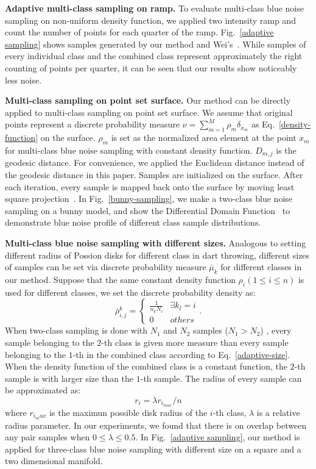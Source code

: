 \textbf{Adaptive multi-class sampling on ramp.}
To evaluate multi-class blue noise sampling on non-uniform density function,
we applied two intensity ramp and count the number of points for each quarter of the ramp.
Fig.~\ref{adaptive sampling} shows samples generated by
our method and Wei's~\cite{wei:2010:multi}.
While samples of every individual class and the combined class represent approximately the right counting of points per quarter,
it can be seen that our results show noticeably less noise.

\textbf{Multi-class sampling on point set surface.}
Our method can be directly applied to multi-class sampling on point set surface.
We assume that original points represent a discrete probability measure $\nu=\sum\limits_{m=1}^{M}\rho_m\delta_{x_m}$ as Eq.~\ref{density-function} on the surface.
$\rho_m$ is set as the normalized area element at the point $x_m$ for multi-class blue noise sampling with constant density function.
$D_{m,j}$ is the geodesic distance.
For convenience,
we applied the Euclidean distance instead of the geodesic distance in this paper.
Samples are initialized on the surface.
After each iteration,
every sample is mapped back onto the surface by
moving least square projection~\cite{alexa:2001:point}.
In Fig.~\ref{bunny-sampling},
we make a two-class blue noise sampling on a bunny model,
and show the Differential Domain Function~\cite{wei:2011:differential} to demonstrate blue noise profile of different class sample distributions.

\textbf{Multi-class blue noise sampling with different sizes.}
Analogous to setting different radius of Possion disks for different class in dart throwing,
different sizes of samples can be set  via discrete probability measure $\bar\mu_k$ for different classes in our method.
Suppose that the same constant density function $\rho_i (1\leq i\leq n)$ is used for different classes,
we set the discrete probability density as:
\begin{equation}\label{adaptive-size}
  \bar\rho_{i,j}^k= \left\{
  \begin{array} {cl}
  \frac{1}{n_kN_i} & \exists k_l = i \\
  0 & others
  \end{array} \right..
\end{equation}
When two-class sampling is done with $N_1$ and $N_2$ samples ($N_1>N_2$) ,
every sample belonging to the $2$-th class is given more measure than every sample belonging to the $1$-th in the combined class according to Eq.~\ref{adaptive-size}.
When the density function of the combined class is a constant function,
the $2$-th sample is with larger size than the $1$-th sample.
The radius of every sample can be approximated as:
\begin{equation*}
  r_i=\lambda r_{i_{max}}/n
\end{equation*}
where $r_{i_max}$ is the maximun possible disk radius of the $i$-th class,
$\lambda$ is a relative radius parameter.
In our experiments,
we found that there is on overlap between any pair samples when $0\leq\lambda\leq 0.5$.
In Fig.~\ref{adaptive sampling},
our method is applied for three-class blue noise sampling with different size on a square and a two dimensional manifold.


